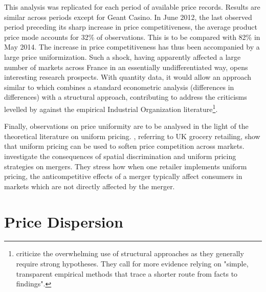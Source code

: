 \documentclass[english]{article}
\begin{document}
This analysis was replicated for each period of available price records. Results are similar across periods except for Geant Casino. In June 2012, the last observed period preceding its sharp increase in price competitiveness, the average product price mode accounts for 32\% of observations. This is to be compared with 82\% in May 2014. The increase in price competitiveness has thus been accompanied by a large price uniformization. Such a shock, having apparently affected a large number of markets across France in an essentially undifferentiated way, opens interesting research prospects. With quantity data, it would allow an approach similar to \cite{ALL16b} which combines a standard econometric analysis (differences in differences) with a structural approach, contributing to address the criticisms levelled by \cite{ANG10} against the empirical Industrial Organization literature\footnote{\cite{ANG10} criticize the overwhelming use of structural approaches as they generally require strong hypotheses. They call for more evidence relying on "simple, transparent empirical methods that trace a shorter route from facts to findings".}.

Finally, observations on price uniformity are to be analysed in the light of the theoretical literature on uniform pricing. \cite{DOB08}, referring to UK grocery retailing, show that uniform pricing can be used to soften price competition across markets. \cite{ALL16a} investigate the consequences of spatial discrimination and uniform pricing strategies on mergers. They stress how when one retailer implements uniform pricing, the anticompetitive effects of a merger typically affect consumers in markets which are not directly affected by the merger.


\section{Price Dispersion}
\end{document}
